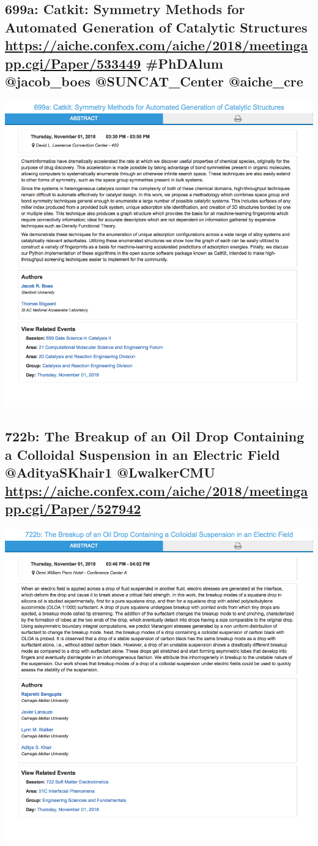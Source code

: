 \documentclass[11pt]{article}
\begin{document}
\subsection{699a: Catkit: Symmetry Methods for Automated Generation of Catalytic Structures \url{https://aiche.confex.com/aiche/2018/meetingapp.cgi/Paper/533449} \#PhDAlum @jacob\_boes @SUNCAT\_Center @aiche\_cre}
\label{sec:org270f472}
\begin{center}
\includegraphics[width=.9\linewidth]{./533449.png}
\end{center}


\subsection{722b: The Breakup of an Oil Drop Containing a Colloidal Suspension in an Electric Field @AdityaSKhair1 @LwalkerCMU \url{https://aiche.confex.com/aiche/2018/meetingapp.cgi/Paper/527942}}
\label{sec:org2408c46}
\begin{center}
\includegraphics[width=.9\linewidth]{./527942.png}
\end{center}
\end{document}
